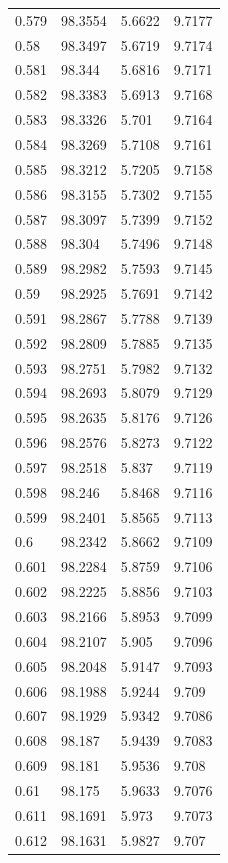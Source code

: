\begin{tabular}{llll}
0.579 & 98.3554 & 5.6622 & 9.7177 \\
0.58 & 98.3497 & 5.6719 & 9.7174 \\
0.581 & 98.344 & 5.6816 & 9.7171 \\
0.582 & 98.3383 & 5.6913 & 9.7168 \\
0.583 & 98.3326 & 5.701 & 9.7164 \\
0.584 & 98.3269 & 5.7108 & 9.7161 \\
0.585 & 98.3212 & 5.7205 & 9.7158 \\
0.586 & 98.3155 & 5.7302 & 9.7155 \\
0.587 & 98.3097 & 5.7399 & 9.7152 \\
0.588 & 98.304 & 5.7496 & 9.7148 \\
0.589 & 98.2982 & 5.7593 & 9.7145 \\
0.59 & 98.2925 & 5.7691 & 9.7142 \\
0.591 & 98.2867 & 5.7788 & 9.7139 \\
0.592 & 98.2809 & 5.7885 & 9.7135 \\
0.593 & 98.2751 & 5.7982 & 9.7132 \\
0.594 & 98.2693 & 5.8079 & 9.7129 \\
0.595 & 98.2635 & 5.8176 & 9.7126 \\
0.596 & 98.2576 & 5.8273 & 9.7122 \\
0.597 & 98.2518 & 5.837 & 9.7119 \\
0.598 & 98.246 & 5.8468 & 9.7116 \\
0.599 & 98.2401 & 5.8565 & 9.7113 \\
0.6 & 98.2342 & 5.8662 & 9.7109 \\
0.601 & 98.2284 & 5.8759 & 9.7106 \\
0.602 & 98.2225 & 5.8856 & 9.7103 \\
0.603 & 98.2166 & 5.8953 & 9.7099 \\
0.604 & 98.2107 & 5.905 & 9.7096 \\
0.605 & 98.2048 & 5.9147 & 9.7093 \\
0.606 & 98.1988 & 5.9244 & 9.709 \\
0.607 & 98.1929 & 5.9342 & 9.7086 \\
0.608 & 98.187 & 5.9439 & 9.7083 \\
0.609 & 98.181 & 5.9536 & 9.708 \\
0.61 & 98.175 & 5.9633 & 9.7076 \\
0.611 & 98.1691 & 5.973 & 9.7073 \\
0.612 & 98.1631 & 5.9827 & 9.707 \\

\end{tabular}
